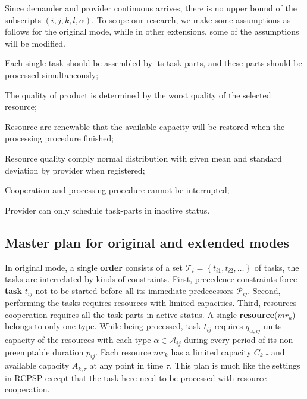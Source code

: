 Since demander and provider continuous arrives, there is no upper bound of the subscripts
$(i,j,k,l,\alpha)$.
To scope our research, we make some assumptions as follows for the original mode, while in other extensions, some of the assumptions will be modified.
\begin{compactitem}
\item Each single task should be assembled by its task-parts, and these parts should be processed simultaneously;
\item The quality of product is determined by the worst quality of the selected resource;
\item Resource are renewable that the available capacity will be restored when the processing procedure finished;
\item Resource quality comply normal distribution with given mean and standard deviation by provider when registered;
\item Cooperation and processing procedure cannot be interrupted;
\item Provider can only schedule task-parts in inactive status.
\end{compactitem}



\subsection{Master plan for original and extended modes} %
\label{ssub:master_plam}
In original mode, a single \textbf{order} consists of a set $\mathcal{T}_i = \left\{ t_{i1},t_{i2},\dots\right\}$ of tasks, the tasks are interrelated by kinds of constraints. First, precedence constraints force \textbf{task} $t_{ij}$ not to be started before all its immediate predecessors $\mathcal{P}_{ij}$. Second, performing the tasks requires resources with limited capacities. Third, resources cooperation requires all the task-parts in active status.
A single \textbf{resource}($mr_k$) belongs to only one type. While being processed, task $t_{ij}$ requires $q_{\alpha,ij}$ units capacity of the resources with each type $\alpha\in\mathcal{A}_{ij}$ during every period of its non-preemptable duration $p_{ij}$. Each resource $mr_k$ has a limited capacity $C_{k,\tau}$ and available capacity $A_{k,\tau}$ at any point in time $\tau$. This plan is much like the settings in RCPSP\cite{Kolisch1999} except that the task here need to be processed with resource cooperation.

